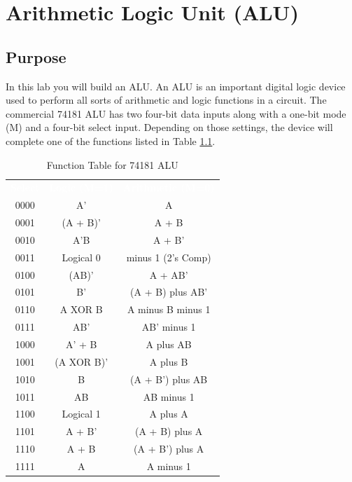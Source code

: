 \chapter{Arithmetic Logic Unit (ALU)}\label{lab04}

\section{Purpose}

In this lab you will build an \acf{ALU}. An \ac{ALU} is an important digital logic device used to perform all sorts of arithmetic and logic functions in a circuit. The commercial 74181 \ac{ALU} has two four-bit data inputs along with a one-bit mode (M) and a four-bit select input. Depending on those settings, the device will complete one of the functions listed in Table \ref{tab0301}.

\begin{table}[H]
	\sffamily
	\newcommand{\head}[1]{\textcolor{white}{\textbf{#1}}}		
	\begin{center}
		\begin{tabular}{ccc} 
			\rowcolor{black!75}
			\head{Select} & \head{Logic (M=1)} &\head{Arithmetic (M=0)} \\
			0000 & A' & A \\
			0001 & (A + B)' & A + B \\
			0010 & A'B & A + B' \\
			0011 & Logical 0 & minus 1 (2's Comp) \\
			0100 & (AB)' & A + AB' \\
			0101 & B' & (A + B) plus AB' \\
			0110 & A XOR B & A minus B minus 1 \\
			0111 & AB' & AB' minus 1 \\
			1000 & A' + B & A plus AB \\
			1001 & (A XOR B)' & A plus B \\
			1010 & B & (A + B') plus AB \\
			1011 & AB & AB minus 1 \\
			1100 & Logical 1 & A plus A \\
			1101 & A + B' & (A + B) plus A \\
			1110 & A + B & (A + B') plus A \\
			1111 & A & A minus 1
		\end{tabular}
	\end{center}
	\caption{Function Table for 74181 ALU}
	\label{tab0301}
\end{table}

